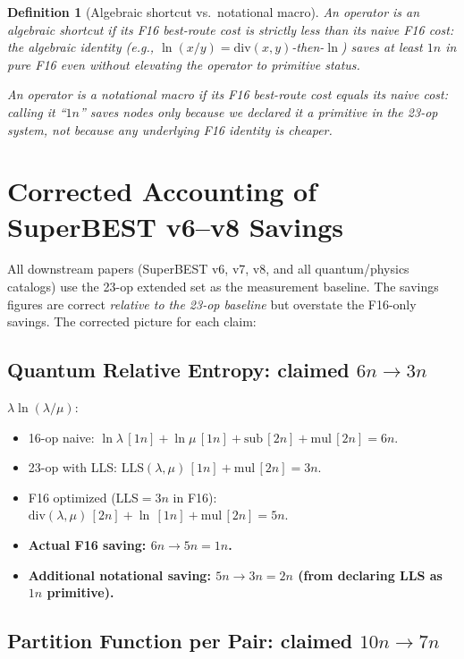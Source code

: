 \documentclass[11pt]{article}
\newtheorem{definition}[theorem]{Definition}
\begin{document}
\begin{definition}[Algebraic shortcut vs.\ notational macro]
An operator is an \emph{algebraic shortcut} if its F16 best-route cost is strictly less
than its naive F16 cost: the algebraic identity (e.g., $\ln(x/y)=\mathrm{div}(x,y)$-then-$\ln$)
saves at least $1n$ in pure F16 even without elevating the operator to primitive status.

An operator is a \emph{notational macro} if its F16 best-route cost equals its naive cost:
calling it ``$1n$'' saves nodes only because we declared it a primitive in the 23-op system,
not because any underlying F16 identity is cheaper.
\end{definition}

\section{Corrected Accounting of SuperBEST v6--v8 Savings}

All downstream papers (SuperBEST v6, v7, v8, and all quantum/physics catalogs) use the 23-op
extended set as the measurement baseline. The savings figures are correct \emph{relative to
the 23-op baseline} but overstate the F16-only savings.
The corrected picture for each claim:

\subsection{Quantum Relative Entropy: claimed $6n\to3n$}

$\lambda\ln(\lambda/\mu)$:
\begin{itemize}
  \item 16-op naive: $\ln\lambda\,[1n] + \ln\mu\,[1n] + \mathrm{sub}\,[2n] + \mathrm{mul}\,[2n] = 6n$.
  \item 23-op with LLS: $\mathrm{LLS}(\lambda,\mu)\,[1n] + \mathrm{mul}\,[2n] = 3n$.
  \item F16 optimized (LLS$=3n$ in F16): $\mathrm{div}(\lambda,\mu)\,[2n] + \ln\,[1n] + \mathrm{mul}\,[2n] = 5n$.
  \item \textbf{Actual F16 saving: $6n\to5n = 1n$.}
  \item \textbf{Additional notational saving: $5n\to3n = 2n$ (from declaring LLS as $1n$ primitive).}
\end{itemize}

\subsection{Partition Function per Pair: claimed $10n\to7n$}
\end{document}
